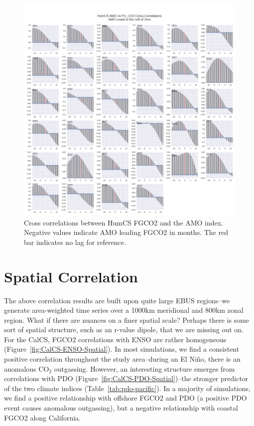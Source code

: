 \documentclass[12pt]{article}
\begin{document}
\begin{figure}[!h]
	\centering
	\includegraphics[width=\linewidth]{../../figs/humcs/cross-correlation/AMO_FGCO2_cross-correlation_HumCS_bothSmoothed.png}
	\caption{Cross correlations between HumCS FGCO2 and the AMO index. Negative values indicate AMO leading FGCO2 in months. The red bar indicates no lag for reference.}
	\label{fig:HumCS-AMO-Cross}
\end{figure}

\clearpage
\section{Spatial Correlation}
The above correlation results are built upon quite large EBUS regions--we generate area-weighted time series over a 1000km meridional and 800km zonal region. What if there are nuances on a finer spatial scale? Perhaps there is some sort of spatial structure, such as an r-value dipole, that we are missing out on. \\

For the CalCS, FGCO2 correlations with ENSO are rather homogeneous (Figure~\ref{fig:CalCS-ENSO-Spatial}). In most simulations, we find a consistent positive correlation throughout the study area--during an El Ni\~no, there is an anomalous CO$_{2}$ outgassing. However, an interesting structure emerges from correlations with PDO (Figure~\ref{fig:CalCS-PDO-Spatial})--the stronger predictor of the two climate indices (Table~\ref{tab:pdo-pacific}). In a majority of simulations, we find a positive relationship with offshore FGCO2 and PDO (a positive PDO event causes anomalous outgassing), but a negative relationship with coastal FGCO2 along California. \\
\end{document}
